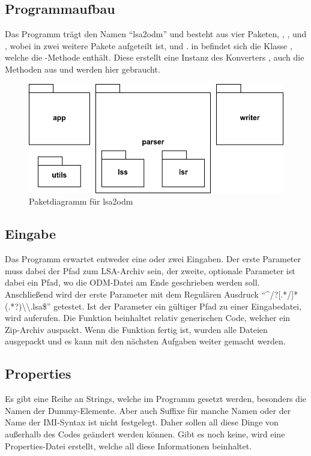 \subsection{Programmaufbau}

Das Programm trägt den Namen \enquote{lsa2odm} und besteht aus vier Paketen, , ,  und , wobei  in zwei weitere Pakete aufgeteilt ist,  und .
in  befindet sich die Klasse , welche die -Methode enthält.
Diese erstellt eine Instanz des Konverters , auch die Methoden aus  und  werden hier gebraucht.

\begin{figure}[h]
			\centering
			\includegraphics[width=.50\textwidth]{./img/i_package.png}
			\caption{Paketdiagramm für lsa2odm}
\end{figure}

\subsection{Eingabe}

Das Programm erwartet entweder eine oder zwei Eingaben. Der erste Parameter muss dabei der Pfad zum LSA-Archiv sein, der zweite, optionale Parameter ist dabei ein Pfad, wo die ODM-Datei am Ende geschrieben werden soll.
Anschließend wird der erste Parameter mit dem Regulären Ausdruck \enquote{\textasciicircum/?[.*/]*(.*?)\textbackslash\textbackslash.lsa\$} getestet.
Ist der Parameter ein gültiger Pfad zu einer Eingabedatei, wird  auferufen.
Die Funktion beinhaltet relativ generischen Code, welcher ein Zip-Archiv auspackt.
Wenn die Funktion fertig ist, wurden alle Dateien ausgepackt und es kann mit den nächsten Aufgaben weiter gemacht werden.

\subsection{Properties}

Es gibt eine Reihe an Strings, welche im Programm gesetzt werden, besonders die Namen der Dummy-Elemente.
Aber auch Suffixe für manche Namen oder der Name der IMI-Syntax ist nicht festgelegt.
Daher sollen all diese Dinge von außerhalb des Codes geändert werden können.
Gibt es noch keine, wird eine Properties-Datei erstellt, welche all diese Informationen beinhaltet.

